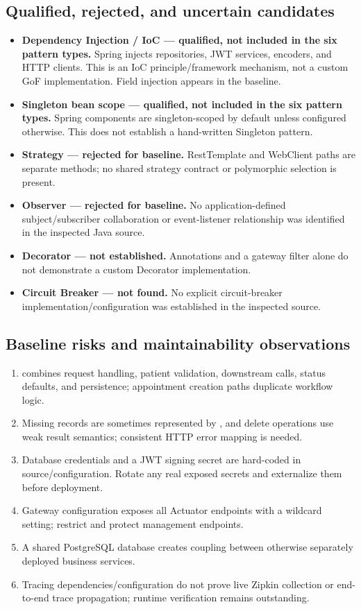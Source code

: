 \documentclass[11pt,a4paper]{article}
\begin{document}
\subsection{Qualified, rejected, and uncertain candidates}
\begin{itemize}
\item \textbf{Dependency Injection / IoC — qualified, not included in the six pattern types.} Spring injects repositories, JWT services, encoders, and HTTP clients. This is an IoC principle/framework mechanism, not a custom GoF implementation. Field injection appears in the baseline.
\item \textbf{Singleton bean scope — qualified, not included in the six pattern types.} Spring components are singleton-scoped by default unless configured otherwise. This does not establish a hand-written Singleton pattern.
\item \textbf{Strategy — rejected for baseline.} RestTemplate and WebClient paths are separate methods; no shared strategy contract or polymorphic selection is present.
\item \textbf{Observer — rejected for baseline.} No application-defined subject/subscriber collaboration or event-listener relationship was identified in the inspected Java source.
\item \textbf{Decorator — not established.} Annotations and a gateway filter alone do not demonstrate a custom Decorator implementation.
\item \textbf{Circuit Breaker — not found.} No explicit circuit-breaker implementation/configuration was established in the inspected source.
\end{itemize}

\subsection{Baseline risks and maintainability observations}
\begin{enumerate}
\item {} combines request handling, patient validation, downstream calls, status defaults, and persistence; appointment creation paths duplicate workflow logic.
\item Missing records are sometimes represented by , and delete operations use weak result semantics; consistent HTTP error mapping is needed.
\item Database credentials and a JWT signing secret are hard-coded in source/configuration. Rotate any real exposed secrets and externalize them before deployment.
\item Gateway configuration exposes all Actuator endpoints with a wildcard setting; restrict and protect management endpoints.
\item A shared PostgreSQL database creates coupling between otherwise separately deployed business services.
\item Tracing dependencies/configuration do not prove live Zipkin collection or end-to-end trace propagation; runtime verification remains outstanding.
\end{enumerate}
\end{document}
